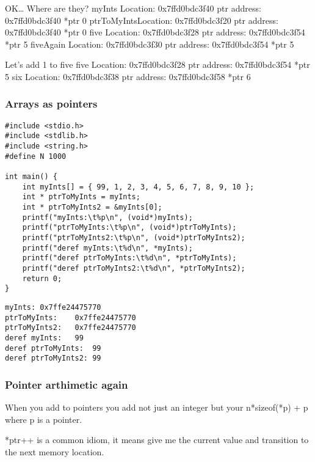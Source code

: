 \documentclass[11pt]{article}
\begin{document}
 OK\ldots{} Where are they?
myInts     Location: 0x7ffd0bdc3f40	 ptr address: 0x7ffd0bdc3f40 	*ptr 0
ptrToMyIntsLocation: 0x7ffd0bdc3f20	 ptr address: 0x7ffd0bdc3f40 	*ptr 0
five       Location: 0x7ffd0bdc3f28	 ptr address: 0x7ffd0bdc3f54 	*ptr 5
fiveAgain  Location: 0x7ffd0bdc3f30	 ptr address: 0x7ffd0bdc3f54 	*ptr 5

Let's add 1 to five
five       Location: 0x7ffd0bdc3f28	 ptr address: 0x7ffd0bdc3f54 	*ptr 5
six        Location: 0x7ffd0bdc3f38	 ptr address: 0x7ffd0bdc3f58 	*ptr 6

\subsubsection{Arrays as pointers}
\label{sec:orge6cceb4}
\begin{verbatim}
#include <stdio.h>
#include <stdlib.h>
#include <string.h>
#define N 1000

int main() {
    int myInts[] = { 99, 1, 2, 3, 4, 5, 6, 7, 8, 9, 10 };
    int * ptrToMyInts = myInts;
    int * ptrToMyInts2 = &myInts[0];
    printf("myInts:\t%p\n", (void*)myInts);
    printf("ptrToMyInts:\t%p\n", (void*)ptrToMyInts);
    printf("ptrToMyInts2:\t%p\n", (void*)ptrToMyInts2);
    printf("deref myInts:\t%d\n", *myInts);
    printf("deref ptrToMyInts:\t%d\n", *ptrToMyInts);
    printf("deref ptrToMyInts2:\t%d\n", *ptrToMyInts2);
    return 0;
}
\end{verbatim}

\begin{verbatim}
myInts:	0x7ffe24475770
ptrToMyInts:	0x7ffe24475770
ptrToMyInts2:	0x7ffe24475770
deref myInts:	99
deref ptrToMyInts:	99
deref ptrToMyInts2:	99
\end{verbatim}

\subsubsection{Pointer arthimetic again}
\label{sec:org888f4f8}

When you add to pointers you add not just an integer but your
n*sizeof(*p) + p where p is a pointer.

*ptr++ is a common idiom, it means give me the current value and
transition to the next memory location.
\end{document}
